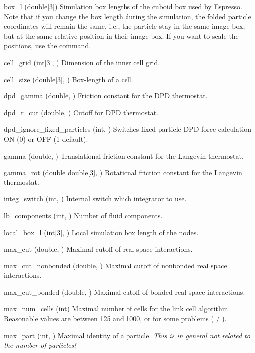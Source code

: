 \begin{globvar}
\item[box_l] (double[3]) Simulation box lengths of the cuboid box used by Espresso. Note that
  if you change the box length during the simulation, the folded
  particle coordinates will remain the same, i.e., the particle stay
  in the same image box, but at the same relative position in their
  image box. If you want to scale the positions, use the
   command.
\item[cell_grid] (int[3], \ro) Dimension of the inner
  cell grid.
\item[cell_size] (double[3], \ro) Box-length of a cell.
\item[dpd_gamma] (double, \ro) Friction constant for the
  DPD thermostat.
\item[dpd_r_cut] (double, \ro) Cutoff for DPD thermostat.
\item[dpd_ignore_fixed_particles] (int, \ro) Switches fixed particle DPD force calculation ON (0) or OFF (1 default).
\item[gamma] (double, \ro) Translational friction constant for the
  Langevin thermostat.
\item[gamma_rot] (double \asep double[3], \ro) Rotational friction constant for the
  Langevin thermostat.
\item[integ_switch] (int, \ro) Internal switch which integrator to
  use.
\item[lb_components] (int, \ro) Number of fluid components.
\item[local_box_l] (int[3], \ro) Local simulation box length of the
  nodes.
\item[max_cut] (double, \ro) Maximal cutoff of real space
  interactions.
\item[max_cut_nonbonded] (double, \ro) Maximal cutoff of nonbonded
  real space interactions.
\item[max_cut_bonded] (double, \ro) Maximal cutoff of bonded
  real space interactions.
\item[max_num_cells] (int) Maximal number of cells for the link cell
  algorithm.  Reasonable values are between 125 and 1000, or for some
  problems ( / ).
\item[max_part] (int, \ro) Maximal identity of a particle.
  \emph{This is in general not related to the number of particles!}

\end{globvar}
